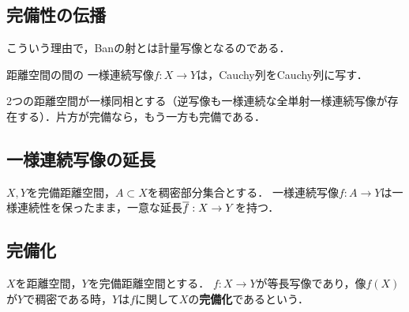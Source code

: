 \documentclass[uplatex,dvipdfmx]{jsreport}
\begin{document}
\subsection{完備性の伝播}

\begin{tcolorbox}[colframe=ForestGreen, colback=ForestGreen!10!white,breakable,colbacktitle=ForestGreen!40!white,coltitle=black,fonttitle=\bfseries\sffamily,
title=]
    こういう理由で，Banの射とは計量写像となるのである．
\end{tcolorbox}

\begin{lemma}
    距離空間の間の
    一様連続写像$f:X\to Y$は，Cauchy列をCauchy列に写す．
\end{lemma}

\begin{theorem}
    2つの距離空間が一様同相とする（逆写像も一様連続な全単射一様連続写像が存在する）．片方が完備なら，もう一方も完備である．
\end{theorem}

\subsection{一様連続写像の延長}

\begin{theorem}
    $X,Y$を完備距離空間，$A\subset X$を稠密部分集合とする．
    一様連続写像$f:A\to Y$は一様連続性を保ったまま，一意な延長$\overline{f}:X\to Y$を持つ．
\end{theorem}

\subsection{完備化}

\begin{definition}[completion]
    $X$を距離空間，$Y$を完備距離空間とする．
    $f:X\to Y$が等長写像であり，像$f(X)$が$Y$で稠密である時，$Y$は$f$に関して$X$の\textbf{完備化}であるという．
\end{definition}
\end{document}
